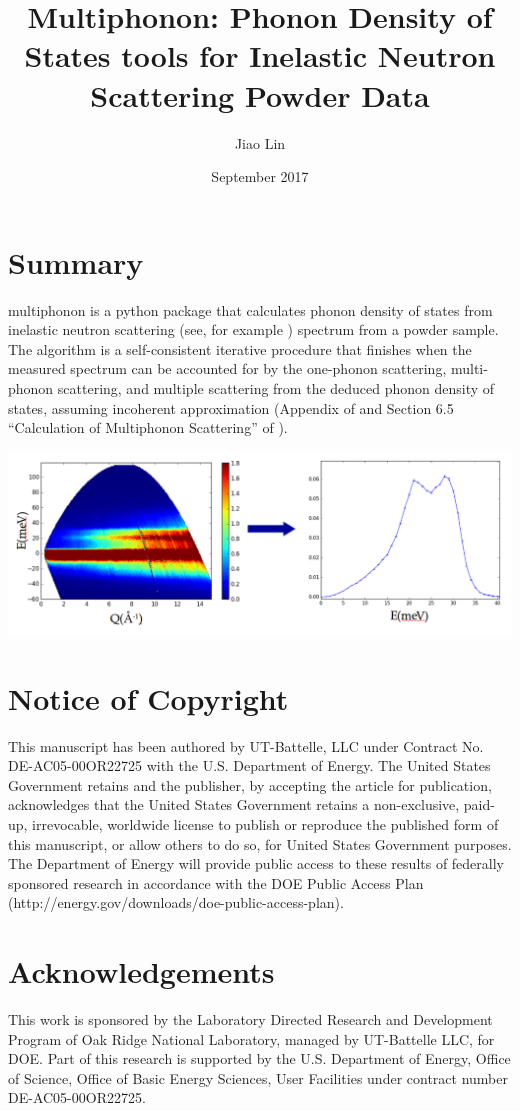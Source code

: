 \documentclass{article}
\title{Multiphonon: Phonon Density of States tools for Inelastic Neutron Scattering Powder Data}
\author[1]{Jiao Lin}
\affil[1]{Neutron Data Analysis and Visualization Division, Oak Ridge National Lab}
\date{September 2017}
\begin{document}
\maketitle

\section{Summary}\label{summary}

multiphonon is a python package that calculates phonon density of states
from inelastic neutron scattering (see, for example \cite{FultzINSbook})
spectrum from a powder sample. The algorithm is a self-consistent
iterative procedure that finishes when
the measured spectrum can be accounted for by
the one-phonon scattering, multi-phonon scattering, and multiple
scattering from the deduced phonon density of states, assuming
incoherent approximation (Appendix of \cite{KreschNickel2007} and
Section 6.5 ``Calculation of Multiphonon Scattering'' of
\cite{FultzINSbook}).

\includegraphics[scale=0.25]{sqe2dos}


\section{Notice of Copyright}\label{notice-of-copyright}

This manuscript has been authored by UT-Battelle, LLC under Contract No.
DE-AC05-00OR22725 with the U.S. Department of Energy. The United States
Government retains and the publisher, by accepting the article for
publication, acknowledges that the United States Government retains a
non-exclusive, paid-up, irrevocable, worldwide license to publish or
reproduce the published form of this manuscript, or allow others to do
so, for United States Government purposes. The Department of Energy will
provide public access to these results of federally sponsored research
in accordance with the DOE Public Access Plan
(http://energy.gov/downloads/doe-public-access-plan).

\section{Acknowledgements}\label{acknowledgements}

This work is sponsored by the Laboratory Directed Research and
Development Program of Oak Ridge National Laboratory, managed by
UT-Battelle LLC, for DOE. Part of this research is supported by the U.S.
Department of Energy, Office of Science, Office of Basic Energy
Sciences, User Facilities under contract number DE-AC05-00OR22725.





\end{document}
